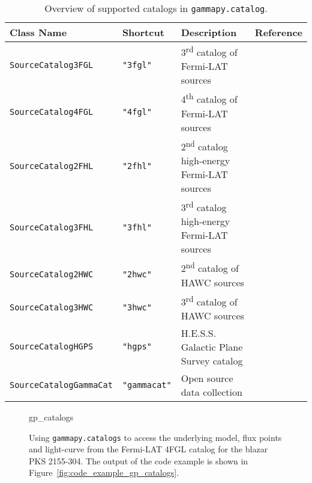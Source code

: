\documentclass[longauth]{aa}
\newcommand{\code}[1]{\texttt{#1}}
\newcommand{\hess}{H.E.S.S.\xspace}
\newcommand{\hawc}{HAWC\xspace}
\newcommand{\fermi}{Fermi-LAT\xspace}
\begin{document}
\begin{table*}[ht!]
    \begin{center}
        \begin{tabular}{llll}
         \hline
         Class Name & Shortcut & Description & Reference\\
         \hline
         \code{SourceCatalog3FGL} & \code{"3fgl"} & 3\textsuperscript{rd} catalog of \fermi sources & \cite{3FGL} \\
         \code{SourceCatalog4FGL} & \code{"4fgl"} & 4\textsuperscript{th} catalog of \fermi  sources & \cite{4FGL} \\
         \code{SourceCatalog2FHL} & \code{"2fhl"} & 2\textsuperscript{nd} catalog high-energy \fermi  sources & \cite{2FHL} \\
         \code{SourceCatalog3FHL} & \code{"3fhl"} & 3\textsuperscript{rd} catalog high-energy \fermi  sources & \cite{3FHL} \\
         \code{SourceCatalog2HWC} & \code{"2hwc"} & 2\textsuperscript{nd} catalog of \hawc sources & \cite{2HWC} \\
         \code{SourceCatalog3HWC} & \code{"3hwc"} & 3\textsuperscript{rd} catalog of \hawc sources & \cite{3HWC} \\
         \code{SourceCatalogHGPS} & \code{"hgps"} & \hess Galactic Plane Survey catalog & \cite{HGPS} \\
         \code{SourceCatalogGammaCat} & \code{"gammacat"} & Open source data collection & \cite{gamma-cat} \\
         \hline
         \end{tabular}
    \end{center}
    \caption{Overview of supported catalogs in \code{gammapy.catalog}.}
    \label{tab:catalogs}
\end{table*}

\begin{figure}
        \small
        {gp_catalogs}
        \caption{Using \code{gammapy.catalogs} to access the underlying model, flux points and
                light-curve from the \fermi 4FGL catalog for the blazar PKS 2155-304. The output
                of the code example is shown in Figure~\ref{fig:code_example_gp_catalogs}.
        }
        \label{fig*:minted:gp_catalogs}
\end{figure}
\end{document}
